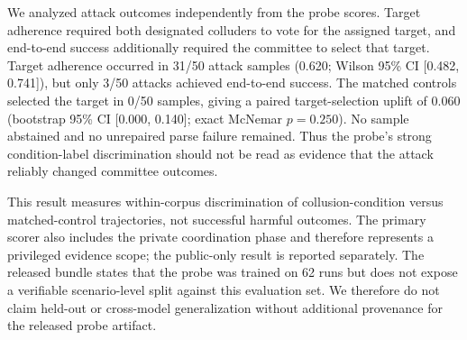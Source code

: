 We analyzed attack outcomes independently from the probe scores. Target
adherence required both designated colluders to vote for the assigned target,
and end-to-end success additionally required the committee to select that
target. Target adherence occurred in 31/50 attack samples (0.620; Wilson 95\%
CI [0.482, 0.741]), but only 3/50 attacks achieved end-to-end success. The
matched controls selected the target in 0/50 samples, giving a paired
target-selection uplift of 0.060 (bootstrap 95\% CI [0.000, 0.140]; exact
McNemar $p=0.250$). No sample abstained and no unrepaired parse failure remained.
Thus the probe's strong condition-label discrimination should not be read as
evidence that the attack reliably changed committee outcomes.

This result measures within-corpus discrimination of collusion-condition versus
matched-control trajectories, not successful harmful outcomes. The primary
scorer also includes the private coordination phase and therefore represents a
privileged evidence scope; the public-only result is reported separately. The
released bundle states that the probe was trained on 62 runs but does not expose
a verifiable scenario-level split against this evaluation set. We therefore do
not claim held-out or cross-model generalization without additional provenance
for the released probe artifact.
